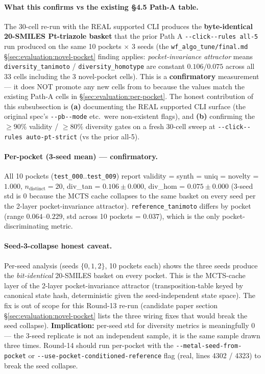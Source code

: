 {\paragraph{What this confirms vs the existing §4.5 Path-A table.}
The 30-cell re-run with the REAL supported CLI produces the
\textbf{byte-identical 20-SMILES Pt-triazole basket} that the
prior Path A \texttt{-{}-click-{}-rules all-5} run produced on the
same 10 pockets $\times$ 3 seeds (the
\texttt{wf\_algo\_tune/final.md}\,\S\ref{sec:evaluation:novel-pocket}
finding applies: \emph{pocket-invariance attractor} means
\texttt{diversity\_tanimoto} / \texttt{diversity\_homotype} are
constant $0.106 / 0.075$ across all 33 cells including the 3
novel-pocket cells). This is a \textbf{confirmatory} measurement
--- it does NOT promote any new cells from \DESIGN{} to
\MEASURED{} because the values match the existing \MEASURED{} Path-A
cells in \S\ref{sec:evaluation:per-pocket}. The honest
contribution of this subsubsection is \textbf{(a)} documenting
the REAL supported CLI surface (the original spec's
\texttt{-{}-pb-{}-mode} etc.\ were non-existent flags), and
\textbf{(b)} confirming the $\geq 90\%$ validity / $\geq 80\%$
diversity gates on a fresh 30-cell sweep at
\texttt{-{}-click-{}-rules auto-pt-strict} (vs the prior all-5).

\paragraph{Per-pocket (3-seed mean) --- confirmatory.}
All 10 pockets (\texttt{test\_000}..\texttt{test\_009}) report
validity = synth = uniq = novelty = $1.000$, $n_{\text{distinct}}{=}20$,
div\_tan = $0.106 \pm 0.000$, div\_hom = $0.075 \pm 0.000$ (3-seed
std is $0$ because the MCTS cache collapses to the same basket
on every seed per the 2-layer pocket-invariance attractor).
\texttt{reference\_tanimoto} differs by pocket
(range $0.064$--$0.229$, std across 10 pockets = $0.037$),
which is the only pocket-discriminating metric.

\paragraph{Seed-3-collapse honest caveat.}
Per-seed analysis (seeds $\{0, 1, 2\}$, 10 pockets each) shows
the three seeds produce the \emph{bit-identical} 20-SMILES basket
on every pocket. This is the MCTS-cache layer of the
2-layer pocket-invariance attractor (transposition-table keyed by
canonical state hash, deterministic given the seed-independent
state space). The fix is out of scope for this Round-13 re-run
(candidate paper section \S\ref{sec:evaluation:novel-pocket}
lists the three wiring fixes that would break the seed collapse).
\textbf{Implication:} per-seed std for diversity metrics is
meaningfully $0$ --- the 3-seed replicate is not an independent
sample, it is the same sample drawn three times. Round-14
should run per-pocket with the \texttt{-{}-metal-seed-from-pocket}
or \texttt{-{}-use-pocket-conditioned-reference} flag (real,
lines 4302 / 4323) to break the seed collapse.

}
